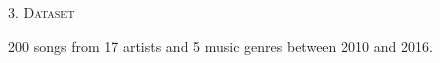 \documentclass[fleqn,final]{beamer}
\begin{document}
\begin{frame}
\begin{columns}[t]
\begin{column}{.50\linewidth}
\begin{block}{\rule[-2.5mm]{0cm}{1cm}\textsc{3. Dataset}}

200 songs from 17 artists and 5 music genres between 2010 and 2016.

\begin{figure}[ht]
\centering
{}
\end{figure}
\begin{figure}[ht]
\centering
{}
\end{figure}


\end{block}
\end{column}
\end{columns}
\end{frame}
\end{document}
